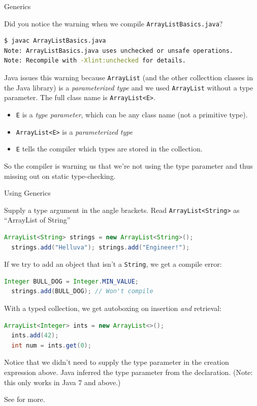 \documentclass{beamer}
\begin{document}
\begin{frame}[fragile]{Generics}


Did you notice the warning when we compile {\tt ArrayListBasics.java}?
\begin{lstlisting}[language=bash]
$ javac ArrayListBasics.java
Note: ArrayListBasics.java uses unchecked or unsafe operations.
Note: Recompile with -Xlint:unchecked for details.
\end{lstlisting}
Java issues this warning because {\tt ArrayList} (and the other collecttion classes in the Java library) is a {\it parameterized type} and we used {\tt ArrayList} without a type parameter.  The full class name is {\tt ArrayList<E>}.
\begin{itemize}
\item {\tt E} is a {\it type parameter}, which can be any class name (not a primitive type).
\item {\tt ArrayList<E>} is a {\it parameterized type}
\item {\tt E} tells the compiler which types are stored in the collection.
\end{itemize}
So the compiler is warning us that we're not using the type parameter and thus missing out on static type-checking.

\end{frame}

\begin{frame}[fragile]{Using Generics}


Supply a type argument in the angle brackets.  Read {\tt ArrayList<String>} as ``ArrayList of String''
\begin{lstlisting}[language=Java]
  ArrayList<String> strings = new ArrayList<String>();
  strings.add("Helluva"); strings.add("Engineer!");
\end{lstlisting}
If we try to add an object that isn't a {\tt String}, we get a compile error:
\begin{lstlisting}[language=Java]
  Integer BULL_DOG = Integer.MIN_VALUE;
  strings.add(BULL_DOG); // Won't compile
\end{lstlisting}

With a typed collection, we get autoboxing on insertion {\it and} retrieval:

\begin{lstlisting}[language=Java]
  ArrayList<Integer> ints = new ArrayList<>();
  ints.add(42);
  int num = ints.get(0);
\end{lstlisting}
Notice that we didn't need to supply the type parameter in the creation expression above.  Java inferred the type parameter from the declaration. (Note: this only works in Java 7 and above.)

See  for more.

\end{frame}
\end{document}
